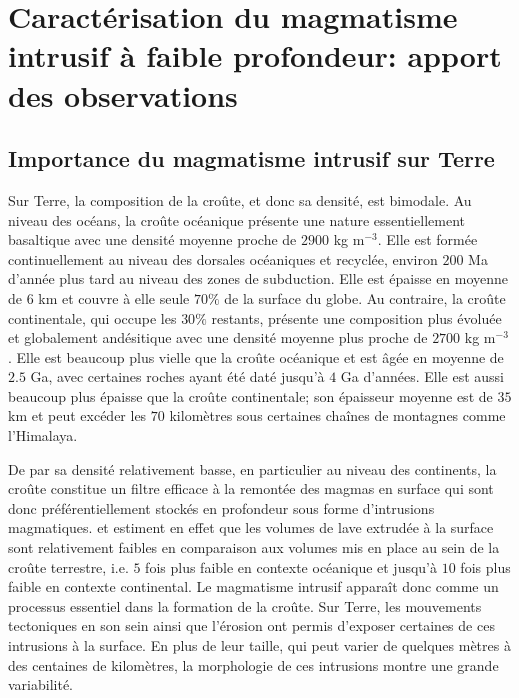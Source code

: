 \section{Caractérisation du  magmatisme intrusif à  faible profondeur:
  apport des observations}
\label{sec:zool-des-intr}

\subsection{Importance du magmatisme intrusif sur Terre}
\label{sec:definition}

Sur  Terre, la  composition  de la  croûte, et  donc  sa densité,  est
bimodale.   Au niveau  des océans,  la croûte  océanique présente  une
nature essentiellement  basaltique avec une densité  moyenne proche de
$2900$ kg  m$^{-3}$.  Elle  est formée  continuellement au  niveau des
dorsales océaniques et recyclée, environ $200$ Ma d'année plus tard au
niveau des zones de subduction. Elle  est épaisse en moyenne de $6$ km
et couvre à elle seule $70\%$ de la surface du globe. Au contraire, la
croûte  continentale, qui  occupe  les $30\%$  restants, présente  une
composition plus  évoluée et globalement andésitique  avec une densité
moyenne plus  proche de  $2700$ kg m$^{-3}$.   Elle est  beaucoup plus
vielle que  la croûte océanique  et est âgée  en moyenne de  $2.5$ Ga,
avec certaines  roches ayant été  daté jusqu'à $4$ Ga  d'années.  Elle
est  aussi  beaucoup plus  épaisse  que  la croûte  continentale;  son
épaisseur moyenne est  de $35$ km et peut excéder  les $70$ kilomètres
sous certaines chaînes de montagnes comme l'Himalaya.

De par  sa densité  relativement basse, en  particulier au  niveau des
continents, la croûte  constitue un filtre efficace à  la remontée des
magmas  en  surface  qui   sont  donc  préférentiellement  stockés  en
profondeur sous forme  d'intrusions magmatiques.  \citet{Crisp:1984dm}
et  \citet{White:2006gr} estiment  en effet  que les  volumes de  lave
extrudée à  la surface  sont relativement  faibles en  comparaison aux
volumes mis  en place au sein  de la croûte terrestre,  i.e.  $5$ fois
plus faible en contexte océanique et  jusqu'à $10$ fois plus faible en
contexte continental.   Le magmatisme intrusif apparaît  donc comme un
processus essentiel  dans la formation  de la croûte.  Sur  Terre, les
mouvements  tectoniques en  son sein  ainsi que  l’érosion ont  permis
d'exposer certaines de  ces intrusions à la surface.  En  plus de leur
taille,  qui  peut  varier  de  quelques mètres  à  des  centaines  de
kilomètres,  la  morphologie  de  ces  intrusions  montre  une  grande
variabilité.

